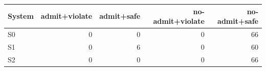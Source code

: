 \begin{tabular}{lrrrr}
\toprule
System & admit+violate & admit+safe & no-admit+violate & no-admit+safe \\
\midrule
S0 & 0 & 0 & 0 & 66 \\
S1 & 0 & 6 & 0 & 60 \\
S2 & 0 & 0 & 0 & 66 \\
\bottomrule
\end{tabular}
